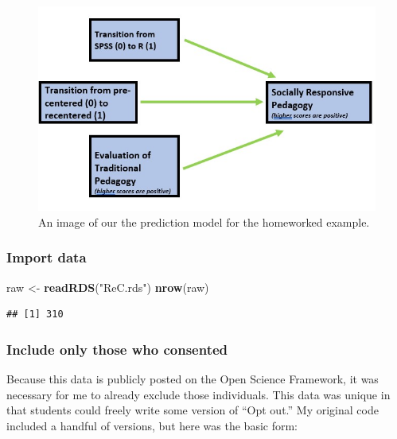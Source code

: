 \documentclass[
  11pt,
]{book}
\newenvironment{Shaded}{\begin{snugshade}}{\end{snugshade}}
\newcommand{\FunctionTok}[1]{\textcolor[rgb]{0.27,0.27,0.27}{\textbf{#1}}}
\newcommand{\NormalTok}[1]{#1}
\newcommand{\OtherTok}[1]{\textcolor[rgb]{0.37,0.37,0.37}{#1}}
\newcommand{\StringTok}[1]{\textcolor[rgb]{0.5,0.5,0.5}{#1}}
\begin{document}
\begin{figure}
\centering
\includegraphics{Worked_Examples/images/homeworked_model.jpg}
\caption{An image of our the prediction model for the homeworked example.}
\end{figure}

\hypertarget{import-data}{%
\subsubsection*{Import data}\label{import-data}}


\begin{Shaded}
\begin{Highlighting}[]
\NormalTok{raw }\OtherTok{\textless{}{-}} \FunctionTok{readRDS}\NormalTok{(}\StringTok{"ReC.rds"}\NormalTok{)}
\FunctionTok{nrow}\NormalTok{(raw)}
\end{Highlighting}
\end{Shaded}

\begin{verbatim}
## [1] 310
\end{verbatim}

\hypertarget{include-only-those-who-consented}{%
\subsubsection*{Include only those who consented}\label{include-only-those-who-consented}}


Because this data is publicly posted on the Open Science Framework, it was necessary for me to already exclude those individuals. This data was unique in that students could freely write some version of ``Opt out.'' My original code included a handful of versions, but here was the basic form:
\end{document}
